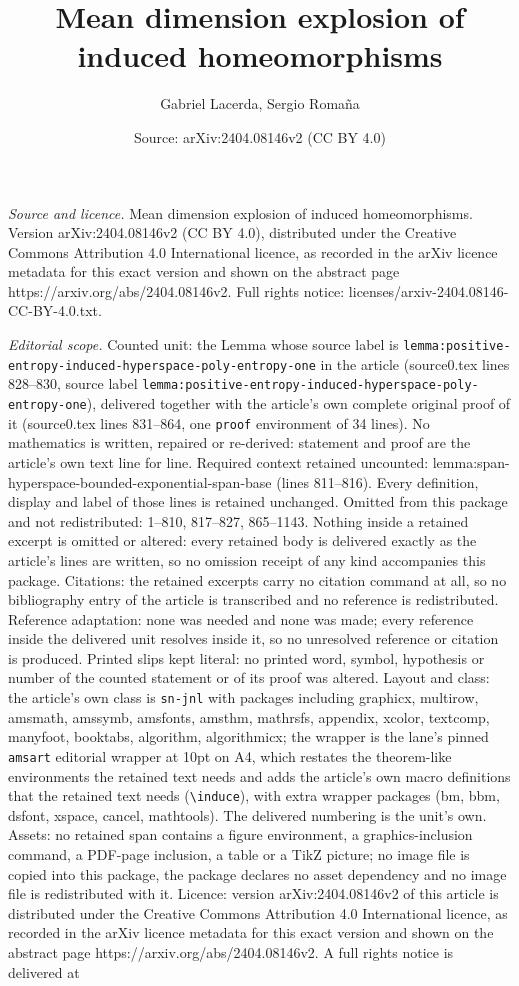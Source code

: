 \documentclass[10pt,a4paper]{amsart}
\title[Mean dimension explosion of induced homeomorphisms]{Mean dimension explosion of induced homeomorphisms}
\author{Gabriel Lacerda, Sergio Roma\~na}
\date{Source: arXiv:2404.08146v2 (CC BY 4.0)}
\begin{document}
\maketitle

\noindent\emph{Source and licence.} Mean dimension explosion of induced homeomorphisms. Version arXiv:2404.08146v2 (CC BY 4.0), distributed under the Creative Commons Attribution 4.0 International licence, as recorded in the arXiv licence metadata for this exact version and shown on the abstract page https://arxiv.org/abs/2404.08146v2. Full rights notice: licenses/arxiv-2404.08146-CC-BY-4.0.txt.\par\smallskip

\noindent\textit{Editorial scope.} Counted unit: the Lemma whose source label is \texttt{lemma:positive-entropy-induced-hyperspace-poly-entropy-one} in the article (source0.tex lines 828--830, source label \texttt{lemma:positive-entropy-induced-hyperspace-poly-entropy-one}), delivered together with the article's own complete original proof of it (source0.tex lines 831--864, one \texttt{proof} environment of 34 lines). No mathematics is written, repaired or re-derived: statement and proof are the article's own text line for line. Required context retained uncounted: lemma:span-hyperspace-bounded-exponential-span-base (lines 811--816). Every definition, display and label of those lines is retained unchanged. Omitted from this package and not redistributed: 1--810, 817--827, 865--1143. Nothing inside a retained excerpt is omitted or altered: every retained body is delivered exactly as the article's lines are written, so no omission receipt of any kind accompanies this package. Citations: the retained excerpts carry no citation command at all, so no bibliography entry of the article is transcribed and no reference is redistributed. Reference adaptation: none was needed and none was made; every reference inside the delivered unit resolves inside it, so no unresolved reference or citation is produced. Printed slips kept literal: no printed word, symbol, hypothesis or number of the counted statement or of its proof was altered. Layout and class: the article's own class is \texttt{sn-jnl} with packages including graphicx, multirow, amsmath, amssymb, amsfonts, amsthm, mathrsfs, appendix, xcolor, textcomp, manyfoot, booktabs, algorithm, algorithmicx; the wrapper is the lane's pinned \texttt{amsart} editorial wrapper at 10pt on A4, which restates the theorem-like environments the retained text needs and adds the article's own macro definitions that the retained text needs (\texttt{\textbackslash induce}), with extra wrapper packages (bm, bbm, dsfont, xspace, cancel, mathtools). The delivered numbering is the unit's own. Assets: no retained span contains a figure environment, a graphics-inclusion command, a PDF-page inclusion, a table or a TikZ picture; no image file is copied into this package, the package declares no asset dependency and no image file is redistributed with it. Licence: version arXiv:2404.08146v2 of this article is distributed under the Creative Commons Attribution 4.0 International licence, as recorded in the arXiv licence metadata for this exact version and shown on the abstract page https://arxiv.org/abs/2404.08146v2. A full rights notice is delivered at 
\end{document}
